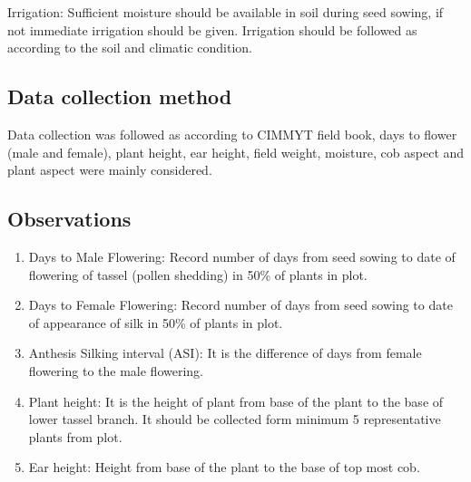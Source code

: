 \documentclass[
]{article}
\begin{document}
Irrigation: Sufficient moisture should be available in soil during seed sowing, if not immediate irrigation should be given. Irrigation should be followed as according to the soil and climatic condition.

\hypertarget{data-collection-method}{%
\subsection{Data collection method}\label{data-collection-method}}

Data collection was followed as according to CIMMYT field book, days to flower (male and female), plant height, ear height, field weight, moisture, cob aspect and plant aspect were mainly considered.

\hypertarget{observations}{%
\subsection{Observations}\label{observations}}

\begin{enumerate}
\def\labelenumi{\arabic{enumi}.}
\item
  Days to Male Flowering: Record number of days from seed sowing to date of flowering of tassel (pollen shedding) in 50\% of plants in plot.
\item
  Days to Female Flowering: Record number of days from seed sowing to date of appearance of silk in 50\% of plants in plot.
\item
  Anthesis Silking interval (ASI): It is the difference of days from female flowering to the male flowering.
\item
  Plant height: It is the height of plant from base of the plant to the base of lower tassel branch. It should be collected form minimum 5 representative plants from plot.
\item
  Ear height: Height from base of the plant to the base of top most cob.
\end{enumerate}
\end{document}
